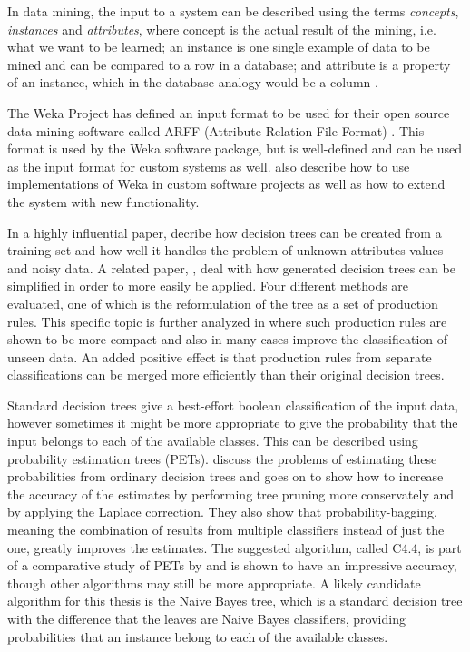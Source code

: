 \documentclass[a4paper]{article}
\begin{document}
In data mining, the input to a system can be described using the terms \emph{concepts}, \emph{instances} and \emph{attributes}, where concept is the actual result of the mining, i.e. what we want to be learned; an instance is one single example of data to be mined and can be compared to a row in a database; and attribute is a property of an instance, which in the database analogy would be a column \citep{Witten2011}.

The Weka Project has defined an input format to be used for their open source data mining software called ARFF (Attribute-Relation File Format) \citep{Garner1995, Witten2011}. This format is used by the Weka software package, but is well-defined and can be used as the input format for custom systems as well. \citet{Witten2011} also describe how to use implementations of Weka in custom software projects as well as how to extend the system with new functionality.

In a highly influential paper, \citet{Quinlan1986} decribe how decision trees can be created from a training set and how well it handles the problem of unknown attributes values and noisy data. A related paper, \citet{Quinlan1987}, deal with how generated decision trees can be simplified in order to more easily be applied. Four different methods are evaluated, one of which is the reformulation of the tree as a set of production rules. This specific topic is further analyzed in \citet{Quinlan1987b} where such production rules are shown to be more compact and also in many cases improve the classification of unseen data. An added positive effect is that production rules from separate classifications can be merged more efficiently than their original decision trees.

Standard decision trees give a best-effort boolean classification of the input data, however sometimes it might be more appropriate to give the probability that the input belongs to each of the available classes. This can be described using probability estimation trees (PETs). \citet{Provost2003} discuss the problems of estimating these probabilities from ordinary decision trees and goes on to show how to increase the accuracy of the estimates by performing tree pruning more conservately and by applying the Laplace correction.  They also show that probability-bagging, meaning the combination of results from multiple classifiers instead of just the one, greatly improves the estimates. The suggested algorithm, called C4.4, is part of a comparative study of PETs by \citet{Chu2011} and is shown to have an impressive accuracy, though other algorithms may still be more appropriate. A likely candidate algorithm for this thesis is the Naive Bayes tree, which is a standard decision tree with the difference that the leaves are Naive Bayes classifiers, providing probabilities that an instance belong to each of the available classes.
\end{document}
